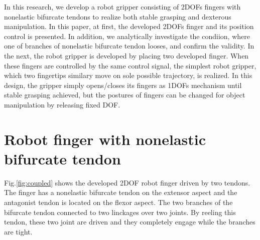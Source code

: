\documentclass{llncs}
\begin{document}
In this research, we develop a robot gripper consisting of 2DOFs fingers
with nonelastic bifurcate tendons to realize both stable grasping and
dexterous manipulation.
In this paper, at first, the developed 2DOFs finger and its position
control is presented.
In addition, we analytically investigate the condiion, where one of
branches of nonelastic bifurcate tendon looses, and confirm the
validity.
In the next, the robot gripper is developed by placing two developed
finger.
When these fingers are controlled by the same control signal, the
simplest robot gripper, which two fingertips similary move on sole
possible trajectory, is realized.
In this design, the gripper simply opens/closes its fingers as 1DOFs
mechanism until stable grasping achieved, but the postures of fingers
can be changed for object manipulation by releasing fixed DOF.


\section{Robot finger with nonelastic bifurcate tendon} %
\label{sec:development}	
Fig.\ref{fig:coupled} shows the developed 2DOF robot finger driven by
two tendons.
The finger has a nonelastic bifurcate tendon on the extensor aspect and
the antagonist tendon is located on the flexor aspect.
The two branches of the bifurcate tendon connected to two linckages over
two joints.
By reeling this tendon, these two joint are driven and they completely
engage while the branches are tight.
\end{document}
